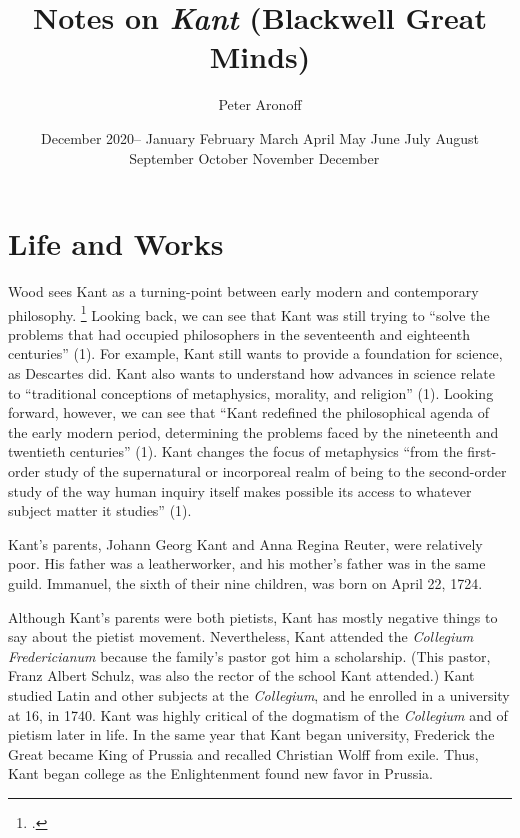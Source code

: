 \documentclass[12pt,letterpaper]{article}
\newcommand{\MONTH}{%
  \ifcase\the\month
  \or January%
  \or February%
  \or March%
  \or April%
  \or May%
  \or June%
  \or July%
  \or August%
  \or September%
  \or October%
  \or November%
  \or December%
  \fi}
\begin{document}
\begin{titlepage}
    \title{Notes on \textit{Kant} (Blackwell Great Minds)}
    \author{Peter Aronoff}
    \date{December 2020--\MONTH\ \the\year}
    \maketitle
    \thispagestyle{empty}
\end{titlepage}

\pagestyle{notes}

\section*{Life and Works}

Wood sees Kant as a turning-point between early modern and contemporary philosophy.%
\footcite[Unless stated otherwise, all references come from][]{kant-wood-2005}
Looking back, we can see that Kant was still trying to ``solve the problems that had occupied philosophers in the seventeenth and eighteenth centuries'' (1).
For example, Kant still wants to provide a foundation for science, as Descartes did.
Kant also wants to understand how advances in science relate to ``traditional conceptions of metaphysics, morality, and religion'' (1).
Looking forward, however, we can see that ``Kant redefined the philosophical agenda of the early modern period, determining the problems faced by the nineteenth and twentieth centuries'' (1).
Kant changes the focus of metaphysics ``from the first-order study of the supernatural or incorporeal realm of being to the second-order study of the way human inquiry itself makes possible its access to whatever subject matter it studies'' (1).

Kant's parents, Johann Georg Kant and Anna Regina Reuter, were relatively poor.
His father was a leatherworker, and his mother's father was in the same guild.
Immanuel, the sixth of their nine children, was born on April 22, 1724.

Although Kant's parents were both pietists, Kant has mostly negative things to say about the pietist movement.
Nevertheless, Kant attended the \textit{Collegium Fredericianum} because the family's pastor got him a scholarship.
(This pastor, Franz Albert Schulz, was also the rector of the school Kant attended.)
Kant studied Latin and other subjects at the \textit{Collegium}, and he enrolled in a university at 16, in 1740.
Kant was highly critical of the dogmatism of the \textit{Collegium} and of pietism later in life.
In the same year that Kant began university, Frederick the Great became King of Prussia and recalled Christian Wolff from exile.
Thus, Kant began college as the Enlightenment found new favor in Prussia.
\end{document}
